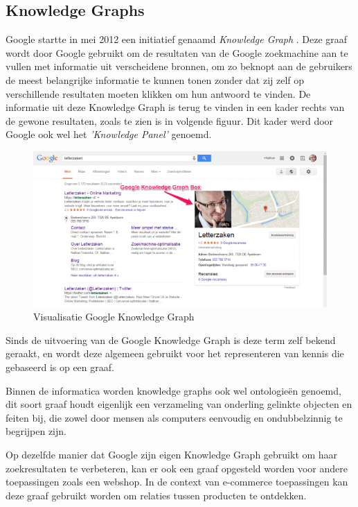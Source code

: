 \subsection{Knowledge Graphs}
\label{sec:Knowledge Graphs}

Google startte in mei 2012 een initiatief genaamd \textit{Knowledge Graph} \autocite{GoogleKnowledgeGraph}. Deze graaf wordt door Google gebruikt om de resultaten van de Google zoekmachine aan te vullen met informatie uit verscheidene bronnen, om zo beknopt aan de gebruikers de meest belangrijke informatie te kunnen tonen zonder dat zij zelf op verschillende resultaten moeten klikken om hun antwoord te vinden. 
\newpage
De informatie uit deze Knowledge Graph is terug te vinden in een kader rechts van de gewone resultaten, zoals te zien is in volgende figuur. Dit kader werd door Google ook wel het \textit{'Knowledge Panel'} genoemd. 

\begin{figure} [ht]
	\centering
	\includegraphics[width=\linewidth]{img/Google_Knowledge_Graph.png}
	\caption[Visualisatie Google Knowledge Graph]{Visualisatie Google Knowledge Graph}
	\label{fig:GoogleKnowledgeGraphVis}
\end{figure}


Sinds de uitvoering van de Google Knowledge Graph is deze term zelf bekend geraakt, en wordt deze algemeen gebruikt voor het representeren van kennis die gebaseerd is op een graaf.

Binnen de informatica worden knowledge graphs ook wel ontologieën genoemd, dit soort graaf houdt eigenlijk een verzameling van onderling gelinkte objecten en feiten bij, die zowel door mensen als computers eenvoudig en ondubbelzinnig te begrijpen zijn.   

Op dezelfde manier dat Google zijn eigen Knowledge Graph gebruikt om haar zoekresultaten te verbeteren, kan er ook een graaf opgesteld worden voor andere toepassingen zoals een webshop. In de context van e-commerce toepassingen kan deze graaf gebruikt worden om relaties tussen producten te ontdekken. 

